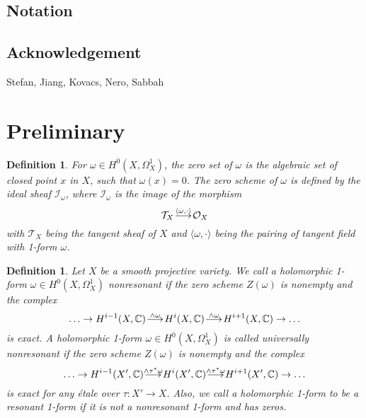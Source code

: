 \documentclass[a4paper,12pt,reqno]{amsart}
\makeatletter
\theoremstyle{plain}
\newtheorem{definition}[theorem]{Definition}
\theoremstyle{remark}
\newcommand{\C}{\mathbb C}
\renewcommand{\longrightarrow}{\xymatrix@1@=15pt{\ar[r]&}}
\makeatother
\begin{document}
\subsection*{Notation}

































\subsection*{Acknowledgement} 

Stefan, Jiang, Kovacs, Nero, Sabbah

\section{Preliminary}



\begin{definition}
For $\omega\in H^0(X, \Omega_X^1)$, the zero set of $\omega$ is the algebraic set of closed point $x$ in $X$, such that $\omega(x)=0$. The zero scheme of $\omega$ is defined by the ideal sheaf $\mathcal{I}_{\omega}$, where  $\mathcal{I}_{\omega}$ is the image of the morphism $$\mathcal{T}_X\overset{\langle\omega, \cdot\rangle}{\longrightarrow} \mathcal{O}_X$$ with $\mathcal{T}_X$ being the tangent sheaf of $X$ and $\langle\omega, \cdot\rangle$ being the pairing of tangent field with 1-form $\omega$.
\end{definition}


\begin{definition}
Let $X$ be a smooth projective variety. We call a holomorphic 1-form $\omega\in H^0(X, \Omega_X^1)$ nonresonant if the zero scheme $Z(\omega)$ is nonempty and the complex $$\ldots\to H^{i-1}(X,\C)\overset{\wedge\omega}{\longrightarrow}H^{i}(X,\C)\overset{\wedge\omega}{\longrightarrow}H^{i+1}(X,\C)\to\ldots$$ is exact. A holomorphic 1-form $\omega\in H^0(X, \Omega_X^1)$ is called universally nonresonant if the zero scheme $Z(\omega)$ is nonempty and the complex $$\ldots\to H^{i-1}(X',\C)\overset{\wedge\tau^*\omega}{\longrightarrow}H^{i}(X',\C)\overset{\wedge\tau^*\omega}{\longrightarrow}H^{i+1}(X',\C)\to\ldots$$ is exact for any \'etale over $\tau: X'\to X$. Also, we call a holomorphic 1-form to be a resonant 1-form if it is not a nonresonant 1-form and has zeros.
\end{definition}
\end{document}
